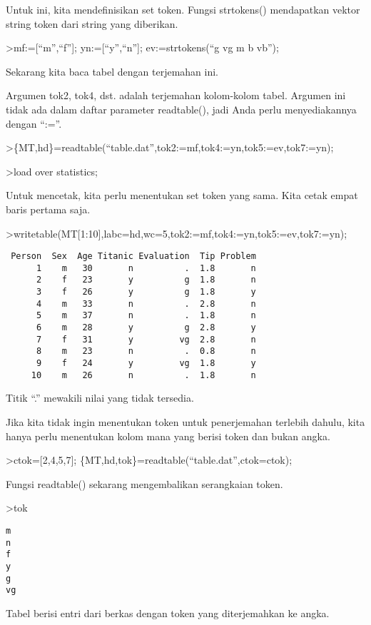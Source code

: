 \documentclass[
]{book}
\begin{document}
Untuk ini, kita mendefinisikan set token. Fungsi strtokens() mendapatkan vektor string token dari string yang diberikan.

\textgreater mf:={[}``m'',``f''{]}; yn:={[}``y'',``n''{]}; ev:=strtokens(``g vg m b vb'');

Sekarang kita baca tabel dengan terjemahan ini.

Argumen tok2, tok4, dst. adalah terjemahan kolom-kolom tabel. Argumen ini tidak ada dalam daftar parameter readtable(), jadi Anda perlu menyediakannya dengan ``:=''.

\textgreater\{MT,hd\}=readtable(``table.dat'',tok2:=mf,tok4:=yn,tok5:=ev,tok7:=yn);

\textgreater load over statistics;

Untuk mencetak, kita perlu menentukan set token yang sama. Kita cetak empat baris pertama saja.

\textgreater writetable(MT{[}1:10{]},labc=hd,wc=5,tok2:=mf,tok4:=yn,tok5:=ev,tok7:=yn);

\begin{verbatim}
 Person  Sex  Age Titanic Evaluation  Tip Problem
      1    m   30       n          .  1.8       n
      2    f   23       y          g  1.8       n
      3    f   26       y          g  1.8       y
      4    m   33       n          .  2.8       n
      5    m   37       n          .  1.8       n
      6    m   28       y          g  2.8       y
      7    f   31       y         vg  2.8       n
      8    m   23       n          .  0.8       n
      9    f   24       y         vg  1.8       y
     10    m   26       n          .  1.8       n
\end{verbatim}

Titik ``.'' mewakili nilai yang tidak tersedia.

Jika kita tidak ingin menentukan token untuk penerjemahan terlebih dahulu, kita hanya perlu menentukan kolom mana yang berisi token dan bukan angka.

\textgreater ctok={[}2,4,5,7{]}; \{MT,hd,tok\}=readtable(``table.dat'',ctok=ctok);

Fungsi readtable() sekarang mengembalikan serangkaian token.

\textgreater tok

\begin{verbatim}
m
n
f
y
g
vg
\end{verbatim}

Tabel berisi entri dari berkas dengan token yang diterjemahkan ke angka.
\end{document}
